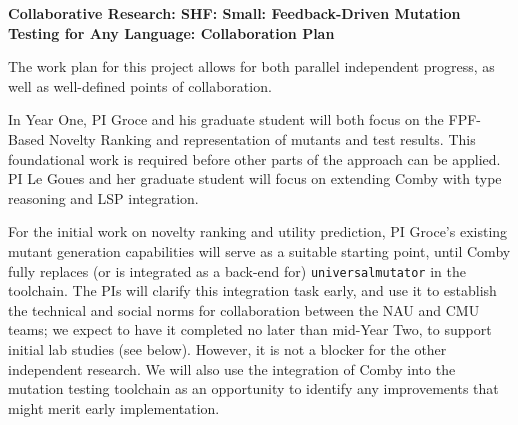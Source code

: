 \documentclass[11pt]{article}
\begin{document}
\begin{center}
{\Large\sf\textbf{Collaborative Research: SHF: Small: Feedback-Driven
    Mutation Testing for Any Language: Collaboration Plan }} 
\end{center}


%

The work plan for this project allows for both parallel independent progress, as
well as well-defined points of collaboration.

In Year One, PI Groce and his graduate student will both focus on the FPF-Based
Novelty Ranking and representation of mutants and test results.  This
foundational work is required before other parts of the approach can be applied.
PI Le Goues and her graduate student will focus on extending Comby with type
reasoning and LSP integration.   

For the initial work on novelty ranking and utility prediction, PI Groce's
existing mutant generation capabilities will serve as a suitable starting
point, until Comby fully replaces (or is integrated as a back-end for) {\tt universalmutator} in the toolchain.  The
PIs will clarify this integration task early, and use it to establish
the technical and social norms for collaboration between the NAU and CMU teams;
we expect to have it completed no later than mid-Year Two, to support initial
lab studies (see below).  
However, it is not a blocker for the other independent research.  
We will also use the integration of Comby into the mutation testing toolchain as
an opportunity to identify any improvements that might merit early
implementation.
\end{document}
